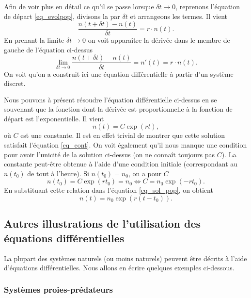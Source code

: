 \documentclass[a4paper,12pt]{book}
\begin{document}
Afin de voir plus en détail ce qu'il se passe lorsque $\delta t\rightarrow 0$, reprenons l'équation de départ \eqref{eq_evolpop},
divisons la par $\delta t$ et arrangeons les termes. Il vient
\begin{equation}
 \frac{n(t+\delta t)-n(t)}{\delta t}=r\cdot n(t).
\end{equation}
En prenant la limite $\delta t\rightarrow 0$ on voit apparaître la dérivée dans le membre de gauche de l'équation ci-dessus
\begin{equation}
 \lim\limits_{\delta t\rightarrow 0} \frac{n(t+\delta t)-n(t)}{\delta t}=n'(t)=r\cdot n(t).\label{eq_cont}
\end{equation}
On voit qu'on a construit ici une équation différentielle à partir d'un système discret.

Nous pouvons à présent résoudre l'équation différentielle ci-dessus en se souvenant que 
la fonction dont la dérivée est proportionnelle à la fonction de départ est l'exponentielle.
Il vient
\begin{equation}
 n(t)=C\exp(r t),\label{eq_sol_pop}
\end{equation}
où $C$ est une constante.
Il est en effet trivial de montrer que cette solution satisfait l'équation \eqref{eq_cont}. 
On voit également qu'il nous manque une condition pour avoir l'unicité de la solution ci-dessus (on
ne connaît toujours pas $C$). La constante peut-être obtenue à l'aide d'une condition initiale (correspondant 
au $n(t_0)$ de tout à l'heure). Si $n(t_0)=n_0$, on a pour $C$
\begin{equation}
 n(t_0)=C\exp(r t_0)=n_0 \Leftrightarrow C=n_0\exp(-r t_0).
\end{equation}
En substituant cette relation dans l'équation \eqref{eq_sol_pop}, on obtient
\begin{equation}
 n(t)=n_0\exp(r (t-t_0)).
\end{equation}

\subsection{Autres illustrations de l'utilisation des équations différentielles}

La plupart des systèmes naturels (ou moins naturels) peuvent être décrits à l'aide d'équations différentielles.
Nous allons en écrire quelques exemples ci-dessous.

\subsubsection{Systèmes proies-prédateurs}
\end{document}
